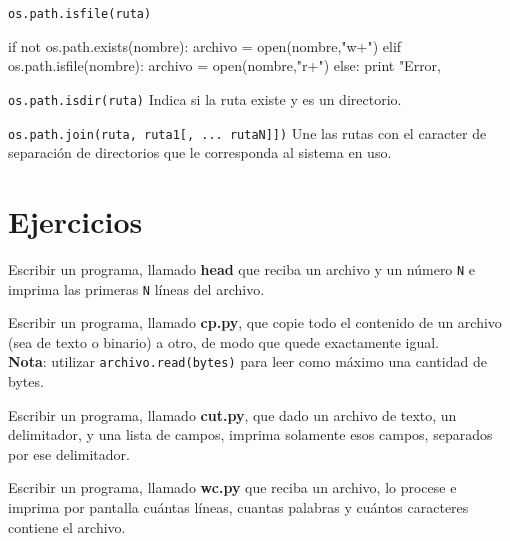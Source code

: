 \begin{referencia_python}
\begin{sintaxis}{\lstinline!os.path.isfile(ruta)!}
\begin{codigo-python}
if not os.path.exists(nombre):
    archivo = open(nombre,"w+")
elif os.path.isfile(nombre):
    archivo = open(nombre,"r+")
else:
	print "Error, %
\end{codigo-python}

\end{sintaxis}

\begin{sintaxis}{\lstinline!os.path.isdir(ruta)!}
Indica si la ruta existe y es un directorio.
\end{sintaxis}

\begin{sintaxis}{\lstinline!os.path.join(ruta, ruta1[, ... rutaN]])!}
Une las rutas con el caracter de separación de directorios que le corresponda
al sistema en uso.
\end{sintaxis}

\end{referencia_python}

\newpage
\section{Ejercicios}

\begin{ejercicio}
Escribir un programa, llamado {\bf head} que reciba un archivo y un número
\lstinline!N! e imprima las primeras \lstinline!N! líneas del archivo.
\end{ejercicio}

\begin{ejercicio}
Escribir un programa, llamado {\bf cp.py}, que copie todo el contenido de un
archivo (sea de texto o binario) a otro, de modo que quede exactamente igual.\\
{\bf Nota}: utilizar \lstinline!archivo.read(bytes)! para leer como máximo
una cantidad de bytes.
\end{ejercicio}

\begin{ejercicio}
Escribir un programa, llamado {\bf cut.py}, que dado un archivo de texto, un
delimitador, y una lista de campos, imprima solamente esos campos, separados
por ese delimitador.
\end{ejercicio}

\begin{ejercicio}
Escribir un programa, llamado {\bf wc.py} que reciba un archivo, lo procese e
imprima por pantalla cuántas líneas, cuantas palabras y cuántos caracteres
contiene el archivo.
\end{ejercicio}


